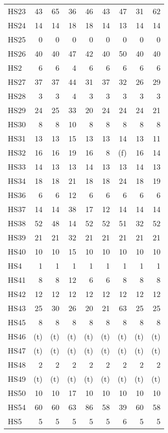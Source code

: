 \documentclass[11pt,twoside]{article}
\begin{document}
{\begin{longtable}[c]{|l|r|r|r|r|r|r|r|r|}
 HS23 & 43 & 65 & 36 & 46 & 43 & 47 & 31 & 62 \\
 HS24 & 14 & 14 & 18 & 18 & 14 & 13 & 14 & 14 \\
 HS25 & 0 & 0 & 0 & 0 & 0 & 0 & 0 & 0 \\
 HS26 & 40 & 40 & 47 & 42 & 40 & 50 & 40 & 40 \\
 HS2 & 6 & 6 & 4 & 6 & 6 & 6 & 6 & 6 \\
 HS27 & 37 & 37 & 44 & 31 & 37 & 32 & 26 & 29 \\
 HS28 & 3 & 3 & 4 & 3 & 3 & 3 & 3 & 3 \\
 HS29 & 24 & 25 & 33 & 20 & 24 & 24 & 24 & 21 \\
 HS30 & 8 & 8 & 10 & 8 & 8 & 8 & 8 & 8 \\
 HS31 & 13 & 13 & 15 & 13 & 13 & 14 & 13 & 11 \\
 HS32 & 16 & 16 & 19 & 16 & 8 & (f) & 16 & 14 \\
 HS33 & 14 & 13 & 13 & 14 & 13 & 13 & 14 & 13 \\
 HS34 & 18 & 18 & 21 & 18 & 18 & 24 & 18 & 19 \\
 HS36 & 6 & 6 & 12 & 6 & 6 & 6 & 6 & 6 \\
 HS37 & 14 & 14 & 38 & 17 & 12 & 14 & 14 & 14 \\
 HS38 & 52 & 48 & 14 & 52 & 52 & 51 & 32 & 52 \\
 HS39 & 21 & 21 & 32 & 21 & 21 & 21 & 21 & 21 \\
 HS40 & 10 & 10 & 15 & 10 & 10 & 10 & 10 & 10 \\
 HS4 & 1 & 1 & 1 & 1 & 1 & 1 & 1 & 1 \\
 HS41 & 8 & 8 & 12 & 6 & 6 & 8 & 8 & 8 \\
 HS42 & 12 & 12 & 12 & 12 & 12 & 12 & 12 & 12 \\
 HS43 & 25 & 30 & 26 & 20 & 21 & 63 & 25 & 25 \\
 HS45 & 8 & 8 & 8 & 8 & 8 & 8 & 8 & 8 \\
 HS46 & (t) & (t) & (t) & (t) & (t) & (t) & (t) & (t) \\
 HS47 & (t) & (t) & (t) & (t) & (t) & (t) & (t) & (t) \\
 HS48 & 2 & 2 & 2 & 2 & 2 & 2 & 2 & 2 \\
 HS49 & (t) & (t) & (t) & (t) & (t) & (t) & (t) & (t) \\
 HS50 & 10 & 10 & 17 & 10 & 10 & 10 & 10 & 10 \\
 HS54 & 60 & 60 & 63 & 86 & 58 & 39 & 60 & 58 \\
 HS5 & 5 & 5 & 5 & 5 & 5 & 6 & 5 & 5 \\

\end{longtable}}
\end{document}

